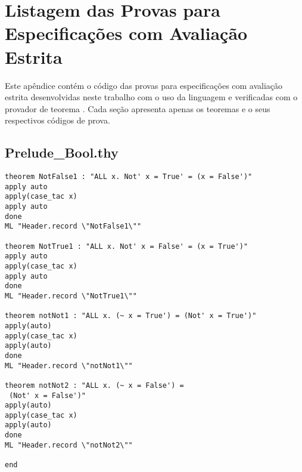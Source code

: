 \chapter{Listagem das Provas para Especificações com Avaliação Estrita}
\label{appendix:strictProofs}
Este apêndice contém o código das provas para especificações com avaliação estrita desenvolvidas neste trabalho com o uso da linguagem \HOL e verificadas com o provador de teorema \Isabelle.
Cada seção apresenta apenas os teoremas e o seus respectivos códigos de prova.

\section{Prelude\_Bool.thy}
\label{appendix:strictProofs:Bool}
\begin{multicols}{2}
\tiny
\begin{Verbatim}
theorem NotFalse1 : "ALL x. Not' x = True' = (x = False')"
apply auto
apply(case_tac x)
apply auto
done
ML "Header.record \"NotFalse1\""

theorem NotTrue1 : "ALL x. Not' x = False' = (x = True')"
apply auto
apply(case_tac x)
apply auto
done
ML "Header.record \"NotTrue1\""

theorem notNot1 : "ALL x. (~ x = True') = (Not' x = True')"
apply(auto)
apply(case_tac x)
apply(auto)
done
ML "Header.record \"notNot1\""

theorem notNot2 : "ALL x. (~ x = False') =
 (Not' x = False')"
apply(auto)
apply(case_tac x)
apply(auto)
done
ML "Header.record \"notNot2\""

end
\end{Verbatim}
\end{multicols}


